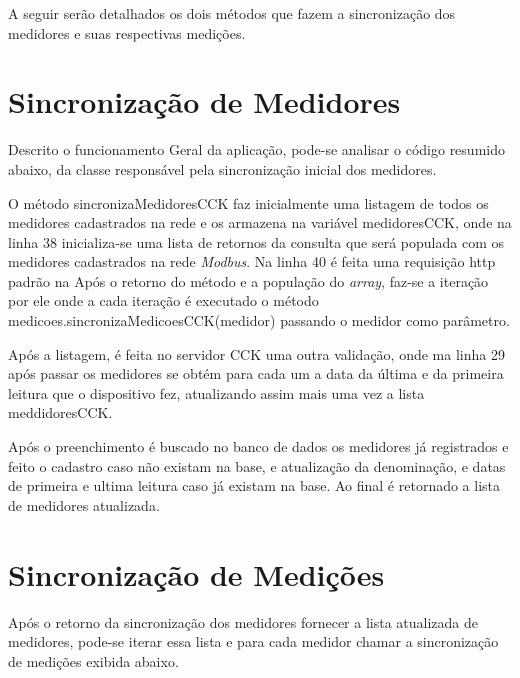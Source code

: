 A seguir serão detalhados os dois métodos que fazem a sincronização dos medidores e suas respectivas medições.



\section{Sincronização de Medidores}
\label{sec:sincronizacao-medidores}

Descrito o funcionamento Geral da aplicação, pode-se analisar o código resumido abaixo, da classe responsável pela sincronização inicial dos medidores.


O método sincronizaMedidoresCCK faz inicialmente uma listagem de todos os medidores cadastrados na rede e os armazena na variável medidoresCCK, onde na linha 38 inicializa-se uma lista de retornos da consulta que será populada com os medidores cadastrados na rede \textit{Modbus}. Na linha 40 é feita uma requisição http padrão na  Após o retorno do método e a população do \textit{array}, faz-se a iteração por ele onde a cada iteração é executado o método medicoes.sincronizaMedicoesCCK(medidor) passando o medidor como parâmetro. 

Após a listagem, é feita no servidor CCK uma outra validação, onde ma linha 29 após passar os medidores se obtém para cada um a data da última e da primeira leitura que o dispositivo fez, atualizando assim mais uma vez a lista meddidoresCCK. 

Após o preenchimento é buscado no banco de dados os medidores já registrados e feito o cadastro caso não existam na base, e atualização da denominação, e datas de primeira e ultima leitura caso já existam na base. Ao final é retornado a lista de medidores atualizada.

\section{Sincronização de Medições}
\label{sec:sincronizacao-medicoes}

Após o retorno da sincronização dos medidores fornecer a lista atualizada de medidores, pode-se iterar essa lista e para cada medidor chamar a sincronização de medições exibida abaixo.

